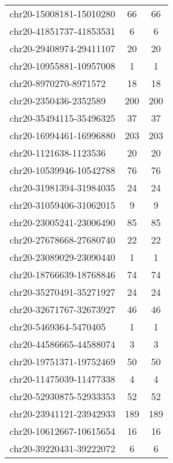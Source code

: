 \documentclass[10pt,letterpaper]{article}
\begin{document}
{\begin{longtable}{lSS}
	chr20-15008181-15010280 & 66     & 66                    \\
	chr20-41851737-41853531 & 6      & 6                     \\
	chr20-29408974-29411107 & 20     & 20                    \\
	chr20-10955881-10957008 & 1      & 1                     \\
	chr20-8970270-8971572   & 18     & 18                    \\
	chr20-2350436-2352589   & 200    & 200                   \\
	chr20-35494115-35496325 & 37     & 37                    \\
	chr20-16994461-16996880 & 203    & 203                   \\
	chr20-1121638-1123536   & 20     & 20                    \\
	chr20-10539946-10542788 & 76     & 76                    \\
	chr20-31981394-31984035 & 24     & 24                    \\
	chr20-31059406-31062015 & 9      & 9                     \\
	chr20-23005241-23006490 & 85     & 85                    \\
	chr20-27678668-27680740 & 22     & 22                    \\
	chr20-23089029-23090440 & 1      & 1                     \\
	chr20-18766639-18768846 & 74     & 74                    \\
	chr20-35270491-35271927 & 24     & 24                    \\
	chr20-32671767-32673927 & 46     & 46                    \\
	chr20-5469364-5470405   & 1      & 1                     \\
	chr20-44586665-44588074 & 3      & 3                     \\
	chr20-19751371-19752469 & 50     & 50                    \\
	chr20-11475039-11477338 & 4      & 4                     \\
	chr20-52930875-52933353 & 52     & 52                    \\
	chr20-23941121-23942933 & 189    & 189                   \\
	chr20-10612667-10615654 & 16     & 16                    \\
	chr20-39220431-39222072 & 6      & 6                     \\

\end{longtable}}
\end{document}
